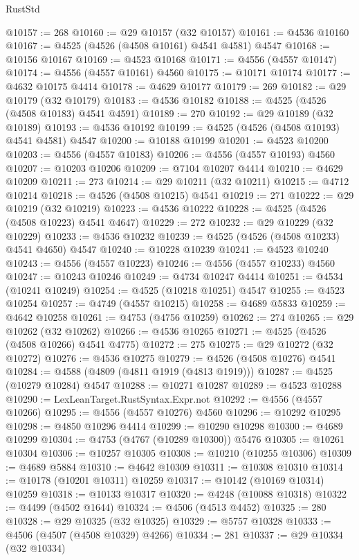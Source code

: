 \begin{lexlean}{RustStd}
\begin{coremodule}
@10157 := 268
@10160 := @29 @10157 (@32 @10157)
@10161 := @4536 @10160
@10167 := @4525 (@4526 (@4508 @10161) @4541 @4581) @4547
@10168 := @10156 @10167
@10169 := @4523 @10168
@10171 := @4556 (@4557 @10147)
@10174 := @4556 (@4557 @10161) @4560
@10175 := @10171 @10174
@10177 := @4632 @10175 @4414
@10178 := @4629 @10177
@10179 := 269
@10182 := @29 @10179 (@32 @10179)
@10183 := @4536 @10182
@10188 := @4525 (@4526 (@4508 @10183) @4541 @4591)
@10189 := 270
@10192 := @29 @10189 (@32 @10189)
@10193 := @4536 @10192
@10199 := @4525 (@4526 (@4508 @10193) @4541 @4581) @4547
@10200 := @10188 @10199
@10201 := @4523 @10200
@10203 := @4556 (@4557 @10183)
@10206 := @4556 (@4557 @10193) @4560
@10207 := @10203 @10206
@10209 := @7104 @10207 @4414
@10210 := @4629 @10209
@10211 := 273
@10214 := @29 @10211 (@32 @10211)
@10215 := @4712 @10214
@10218 := @4526 (@4508 @10215) @4541
@10219 := 271
@10222 := @29 @10219 (@32 @10219)
@10223 := @4536 @10222
@10228 := @4525 (@4526 (@4508 @10223) @4541 @4647)
@10229 := 272
@10232 := @29 @10229 (@32 @10229)
@10233 := @4536 @10232
@10239 := @4525 (@4526 (@4508 @10233) @4541 @4650) @4547
@10240 := @10228 @10239
@10241 := @4523 @10240
@10243 := @4556 (@4557 @10223)
@10246 := @4556 (@4557 @10233) @4560
@10247 := @10243 @10246
@10249 := @4734 @10247 @4414
@10251 := @4534 (@10241 @10249)
@10254 := @4525 (@10218 @10251) @4547
@10255 := @4523 @10254
@10257 := @4749 (@4557 @10215)
@10258 := @4689 @5833
@10259 := @4642 @10258
@10261 := @4753 (@4756 @10259)
@10262 := 274
@10265 := @29 @10262 (@32 @10262)
@10266 := @4536 @10265
@10271 := @4525 (@4526 (@4508 @10266) @4541 @4775)
@10272 := 275
@10275 := @29 @10272 (@32 @10272)
@10276 := @4536 @10275
@10279 := @4526 (@4508 @10276) @4541
@10284 := @4588 (@4809 (@4811 @1919 (@4813 @1919)))
@10287 := @4525 (@10279 @10284) @4547
@10288 := @10271 @10287
@10289 := @4523 @10288
@10290 := LexLeanTarget.RustSyntax.Expr.not
@10292 := @4556 (@4557 @10266)
@10295 := @4556 (@4557 @10276) @4560
@10296 := @10292 @10295
@10298 := @4850 @10296 @4414
@10299 := @10290 @10298
@10300 := @4689 @10299
@10304 := @4753 (@4767 (@10289 @10300)) @5476
@10305 := @10261 @10304
@10306 := @10257 @10305
@10308 := @10210 (@10255 @10306)
@10309 := @4689 @5884
@10310 := @4642 @10309
@10311 := @10308 @10310
@10314 := @10178 (@10201 @10311) @10259
@10317 := @10142 (@10169 @10314) @10259
@10318 := @10133 @10317
@10320 := @4248 (@10088 @10318)
@10322 := @4499 (@4502 @1644)
@10324 := @4506 (@4513 @4452)
@10325 := 280
@10328 := @29 @10325 (@32 @10325)
@10329 := @5757 @10328
@10333 := @4506 (@4507 (@4508 @10329) @4266)
@10334 := 281
@10337 := @29 @10334 (@32 @10334)

\end{coremodule}
\end{lexlean}
